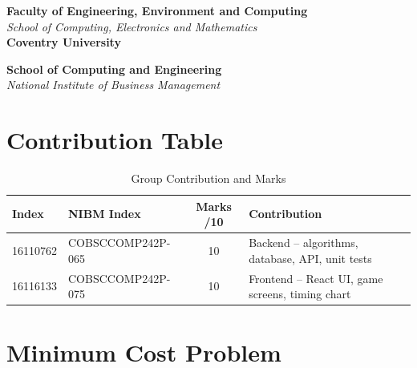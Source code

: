 \documentclass[12pt,a4paper]{article}
\begin{document}
\begin{titlepage}
    \vfill

    {\bfseries Faculty of Engineering, Environment and Computing} \\
    {\itshape School of Computing, Electronics and Mathematics} \\
    {\bfseries Coventry University}

    \vspace{0.8cm}

    {\bfseries School of Computing and Engineering} \\
    {\itshape National Institute of Business Management}

    \vspace{0.5cm}
\end{titlepage}

\newpage
{}
\cfoot{\thepage}

\listoffigures
\newpage

\listoftables
\newpage

\tableofcontents
\newpage

\section*{Contribution Table}

\begin{table}[H]
    \centering
    \caption{Group Contribution and Marks}
    \begin{tabularx}{\textwidth}{|l|l|c|X|}
        \hline
        \textbf{Index} & \textbf{NIBM Index} & \textbf{Marks /10} & \textbf{Contribution} \\
        \hline
        16110762 & COBSCCOMP242P-065 & 10 & Backend -- algorithms, database, API, unit tests \\
        \hline
        16116133 & COBSCCOMP242P-075 & 10 & Frontend -- React UI, game screens, timing chart \\
        \hline
    \end{tabularx}
\end{table}

\newpage

\pagestyle{fancy}
\fancyhf{}
\renewcommand{\headrulewidth}{0pt}
\fancyfoot[R]{\thepage}

\section{Minimum Cost Problem}
\end{document}

